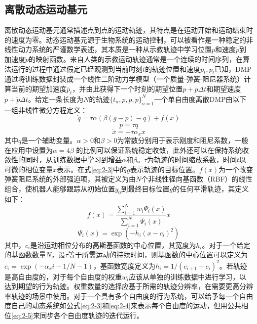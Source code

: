 \subsection{离散动态运动基元}
离散动态运动基元通常描述点到点的运动轨迹，其特点是在运动开始和运动结束时的速度为零。动态运动基元源于生物系统的运动控制，可以被看作是一种稳定的非线性动力系统的严谨数学表述，其本质是一种从示教轨迹中学习位置$p$和速度$\dot{p}$到加速度$\ddot{p}$的映射函数。来自人类的示教运动轨迹通常是一个连续的时间序列，在算法运行的过程中通过假定已经观测到当前时刻$t$的轨迹位置和速度${p_t,\dot{p_t}}$已知，DMP通过将训练数据封装成一个线性二阶动力学模型（一个质量-弹簧-阻尼器系统）计算当前的期望加速度$\ddot{p_t}$，并由此获得下一个时刻的期望位置$p+\dot{p}\Delta t$和期望速度$\dot{p}+\ddot{p}\Delta t$\cite{HuangJiQiRenYunDongGuiJiDeMoFangXueXiZongShu}。给定一条长度为$N$的轨迹$\{ t_n,p,\dot{p},\ddot{p} \}_{n=1}^N$一个单自由度离散DMP由以下一组非线性微分方程定义：
\begin{equation}
    \dot{q}=\tau \alpha\left(\beta(g-p)-q\right)+f(x)
    \label{eq:2-3}
\end{equation}
\begin{equation}
    \dot{p}=\tau q 
    \label{eq:2-4}
\end{equation}
\begin{equation}
    \dot{x}=-\tau \alpha_x x
    \label{eq:2-5}
\end{equation}
其中$q$是一个辅助变量。$\alpha>0$和$\beta>0$为常数分别用于表示刚度和阻尼系数，一般在应用中设置为$\alpha=4\beta$ 的比例可以保证系统稳定收敛，此外还可以在保持系统收敛性的同时，从训练数据中学习到增益$α$和$β$\cite{tanApplyingAdaptiveControlb}。$\tau$为轨迹的时间缩放系数，时间$t$以可微的相位变量$x$表示。在式\ref{eq:2-3}中的$g$表示轨迹的目标位置。$f(x)$为一个改变弹簧阻尼系统的外部强迫项，其被定义为由$N$个非线性径向基函数（RBF）的线性组合，使机器人能够跟踪从初始位置$y_0$到最终目标位置$g$的任何平滑轨迹，其定义如下：
\begin{equation}
    f(x)=\frac{\sum_{i=1}^N w_i \Psi_i(x)}{\sum_{i=1}^N \Psi_i(x)} x
    \label{eq:2-6}
\end{equation}
\begin{equation}
    \Psi_i(x)=\exp \left(-h_i\left(x-c_i\right)^2\right)
    \label{eq:2-7}
\end{equation}
其中，$c_i$是沿运动相位分布的高斯基函数的中心位置，其宽度为$h_i$。对于一个给定的基函数数量$N$，设$τ$等于所需运动的持续时间，则基函数的中心位置可以定义为$c_i=\exp \left(-\alpha_x i-1 / N-1\right)$，基函数宽度定义为$h_i=1 /\left(c_{i+1}-c_i\right)^2$。若轨迹是高自由度的，对于每个自由度的权重$w_i$应该从单独的训练数据中进行学习，以达到期望的行为轨迹。权重数量的选择应基于所需的轨迹分辨率，在需要更高分辨率轨迹的场景中使用。对于一个具有多个自由度的行为系统，可以给予每一个自由度自己的动态系统如公式\ref{eq:2-3}和\ref{eq:2-4}来表示每个自由度的运动，但用公共相位\ref{eq:2-5}来同步各个自由度轨迹的迭代运行。

